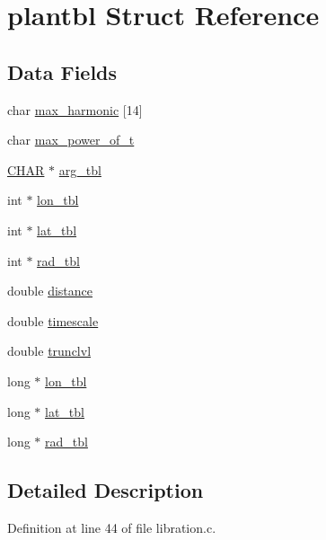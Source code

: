 \hypertarget{structplantbl}{\section{plantbl Struct Reference}
\label{structplantbl}
}
\subsection*{Data Fields}
\begin{DoxyCompactItemize}
\item 
char \hyperlink{structplantbl_ac78decd8f4f44e8641dd629285f532ee}{max\-\_\-harmonic} \mbox{[}14\mbox{]}
\item 
char \hyperlink{structplantbl_a9c423e6b1a2ef97627cf3f593379a5d6}{max\-\_\-power\-\_\-of\-\_\-t}
\item 
\hyperlink{moon_8c_a35cd67ba7bb0db8105eb6267467535d7}{C\-H\-A\-R} $\ast$ \hyperlink{structplantbl_a9ceee9dfe0bb4ed99bc3b7b4b4c12af0}{arg\-\_\-tbl}
\item 
int $\ast$ \hyperlink{structplantbl_a893643004cfbecb46a1d3fd4b4857cd6}{lon\-\_\-tbl}
\item 
int $\ast$ \hyperlink{structplantbl_ad241ee68e54f70ef891439e93bc82096}{lat\-\_\-tbl}
\item 
int $\ast$ \hyperlink{structplantbl_a0ff08cc01d8950876d32a2c7c577d186}{rad\-\_\-tbl}
\item 
double \hyperlink{structplantbl_ab9acb040d8ff71d13c43e41b774af6e1}{distance}
\item 
double \hyperlink{structplantbl_a3e2d024d73e69f7b206e9897e2ef5899}{timescale}
\item 
double \hyperlink{structplantbl_a64f2717aa4612ef968d72e639702c543}{trunclvl}
\item 
long $\ast$ \hyperlink{structplantbl_ad51a63fde0dbefd2581ff16c96f95230}{lon\-\_\-tbl}
\item 
long $\ast$ \hyperlink{structplantbl_a5a3e52dc23c73a6016fe2ccdd30f4d4f}{lat\-\_\-tbl}
\item 
long $\ast$ \hyperlink{structplantbl_ad251398d26d585b019b815cf883bdf21}{rad\-\_\-tbl}
\end{DoxyCompactItemize}


\subsection{Detailed Description}


Definition at line 44 of file libration.\-c.



